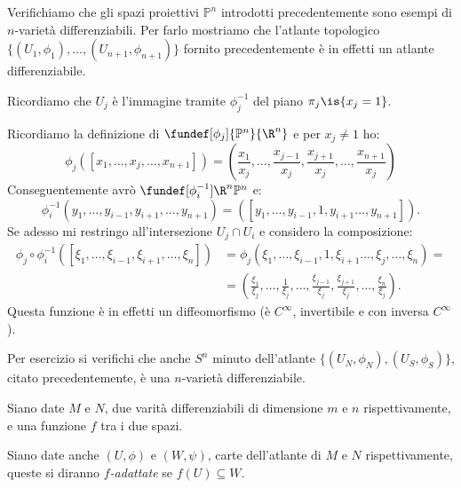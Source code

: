 

\begin{es}
Verifichiamo che gli spazi proiettivi $\mathbb{P}^n$ introdotti precedentemente sono esempi di $n$-varietà differenziabili. Per farlo mostriamo che l'atlante topologico $\{(U_1,\phi_1),\dots,(U_{n+1},\phi_{n+1})\}$ fornito precedentemente è in effetti un atlante differenziabile.

Ricordiamo che $U_j$ è l'immagine tramite $\phi_j^{-1}$ del piano $\pi_{j}\is \{x_{j}=1 \}$.

Ricordiamo la definizione di $\fundef[\phi_j]{\mathbb{P}^n}{\R^n}$ e per $x_j \neq 1$ ho:
\begin{equation*}
\phi_j([x_1,\dots,x_j,\dots,x_{n+1}])=\left (\frac{x_1}{x_j},\dots,\frac{x_{j-1}}{x_j},\frac{x_{j+1}}{x_j},\dots,\frac{x_{n+1}}{x_j} \right )
\end{equation*}
Conseguentemente avrò $\fundef[\phi_i^{-1}]{\R^n}{\mathbb{P}^n}$ e:
\begin{equation*}
\phi_i^{-1}(y_1,\dots,y_{i-1},y_{i+1},\dots,y_{n+1})=([y_1,\dots,y_{i-1},1,y_{i+1}\dots,y_{n+1}]).
\end{equation*}
Se adesso mi restringo all'intersezione $U_j \cap U_i$ e considero la composizione:
\begin{equation*}
\begin{split}
\phi_j \circ \phi_i^{-1}([\xi_1,\dots,\xi_{i-1},\xi_{i+1},\dots,\xi_n])& =\phi_j(\xi_1,\dots,\xi_{i-1},1,\xi_{i+1}\dots,\xi_j,\dots,\xi_n)=\\
& =\left (\frac{\xi_1}{\xi_j},\dots,\frac{1}{\xi_j},\dots,\frac{\xi_{j-1}}{\xi_j},\frac{\xi_{j+1}}{\xi_j},\dots,\frac{\xi_n}{\xi_j}\right ).
\end{split}
\end{equation*}
Questa funzione è in effetti un diffeomorfismo (è $C^\infty$, invertibile e con inversa $C^\infty$).


Per esercizio si verifichi che anche $S^n$ minuto dell'atlante $\{(U_N,\phi_N),(U_S,\phi_S)\}$, citato precedentemente, è una $n$-varietà differenziabile.
\end{es}

\begin{defn}
Siano date $M$ e $N$, due varità differenziabili di dimensione $m$ e $n$ rispettivamente, e una funzione $f$ tra i due spazi.

Siano date anche $(U,\phi)$ e $(W,\psi)$, carte dell'atlante di $M$ e $N$ rispettivamente, queste si diranno \emph{$f$-adattate} se $f(U)\subseteq W.$
\end{defn}

